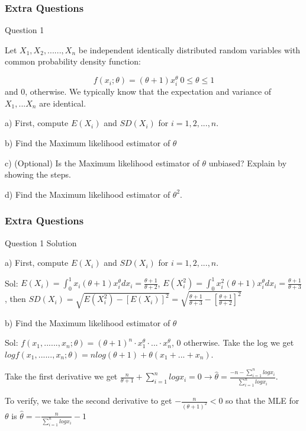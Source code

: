 \documentclass{beamer}
\begin{document}

\begin{frame}
\frametitle{Extra Questions}
\begin{block}{Question 1}

Let $X_1, X_2, ......, X_n$ be independent identically distributed random variables with common probability density function:

$$f(x_i;\theta) = (\theta+1) x_i^{\theta} \ 0\le \theta \le 1$$
and 0, otherwise. We typically know that the expectation and variance of $X_1,...X_n$ are identical.

a) First, compute $E(X_i)$ and $SD(X_i)$ for $i=1,2,...,n$.

b) Find the Maximum likelihood estimator of $\theta$

c) (Optional) Is the Maximum likelihood estimator of $\theta$ unbiased? Explain by showing the steps.

d) Find the Maximum likelihood estimator of $\theta^2$.

\end{block}


\end{frame}


\begin{frame}
\frametitle{Extra Questions}
\begin{block}{Question 1 Solution}

a) First, compute $E(X_i)$ and $SD(X_i)$ for $i=1,2,...,n$.

Sol: $E(X_i) = \int_0^1 x_i (\theta+1) x_i^{\theta} dx_i = \frac{\theta +1}{\theta+2}$, $E(X_i^2) = \int_0^1 x_i^2 (\theta+1) x_i^{\theta} dx_i = \frac{\theta +1}{\theta+3}$, then $SD(X_i) = \sqrt{E(X_i^2) - [E(X_i)]^2} = \sqrt{\frac{\theta +1}{\theta+3} - [\frac{\theta +1}{\theta+2}]^2}$

\vspace{3mm}

b) Find the Maximum likelihood estimator of $\theta$

Sol: $f(x_1,......,x_n;\theta) = (\theta+1)^n \cdot x_1^{\theta} \cdot ... \cdot x_n^{\theta}$, 0 otherwise. Take the log we get $log f(x_1,......,x_n;\theta) = n log(\theta+1) +  \theta(x_1 + ... + x_n)$. 

Take the first derivative we get $\frac{n}{\theta+1} + \sum_{i=1}^n log x_i = 0 \rightarrow \hat \theta = \frac{-n - \sum_{i=1}^n log x_i}{\sum_{i=1}^n log x_i}$.

To verify, we take the second derivative to get $-\frac{n}{(\theta+1)^2} <0$ so that the MLE for $\theta$ is $\hat \theta = -\frac{n}{\sum_{i=1}^n log x_i} - 1$

\end{block}
\end{frame}
\end{document}
